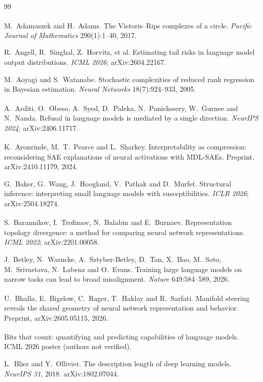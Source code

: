 \documentclass[11pt,a4paper]{article}
\newcommand{\unv}{\textsuperscript{\dag}}
\begin{document}
\clearpage
{}
\begin{thebibliography}{99}\small\raggedright
\setlength{\itemsep}{3pt}

\unv{} M.~Adamaszek and H.~Adams. The Vietoris--Rips
complexes of a circle. \emph{Pacific Journal of Mathematics} 290(1):1--40,
2017.

 R.~Angell, R.~Singhal, Z.~Horvitz, et al.
Estimating tail risks in language model output distributions. \emph{ICML
2026}; arXiv:2604.22167.

 M.~Aoyagi and S.~Watanabe. Stochastic
complexities of reduced rank regression in Bayesian estimation.
\emph{Neural Networks} 18(7):924--933, 2005.

\unv{} A.~Arditi, O.~Obeso, A.~Syed, D.~Paleka,
N.~Panickssery, W.~Gurnee and N.~Nanda. Refusal in language models is
mediated by a single direction. \emph{NeurIPS 2024}; arXiv:2406.11717.

\unv{} K.~Ayonrinde, M.~T.~Pearce and L.~Sharkey.
Interpretability as compression: reconsidering SAE explanations of neural
activations with MDL-SAEs. Preprint, arXiv:2410.11179, 2024.

 G.~Baker, G.~Wang, J.~Hoogland, V.~Pathak and
D.~Murfet. Structural inference: interpreting small language models with
susceptibilities. \emph{ICLR 2026}; arXiv:2504.18274.

\unv{} S.~Barannikov, I.~Trofimov, N.~Balabin and
E.~Burnaev. Representation topology divergence: a method for comparing neural
network representations. \emph{ICML 2022}; arXiv:2201.00058.

 J.~Betley, N.~Warncke, A.~Sztyber-Betley, D.~Tan,
X.~Bao, M.~Soto, M.~Srivastava, N.~Labenz and O.~Evans. Training large
language models on narrow tasks can lead to broad misalignment.
\emph{Nature} 649:584--589, 2026.

\unv{} U.~Bhalla, E.~Bigelow, C.~Rager, T.~Haklay and
R.~Sarfati. Manifold steering reveals the shared geometry of neural network
representation and behavior. Preprint, arXiv:2605.05115, 2026.

\unv{} Bits that count: quantifying and
predicting capabilities of language models. ICML 2026 poster (authors not
verified).

 L.~Blier and Y.~Ollivier. The description
length of deep learning models. \emph{NeurIPS 31}, 2018. arXiv:1802.07044.


\end{thebibliography}
\end{document}
